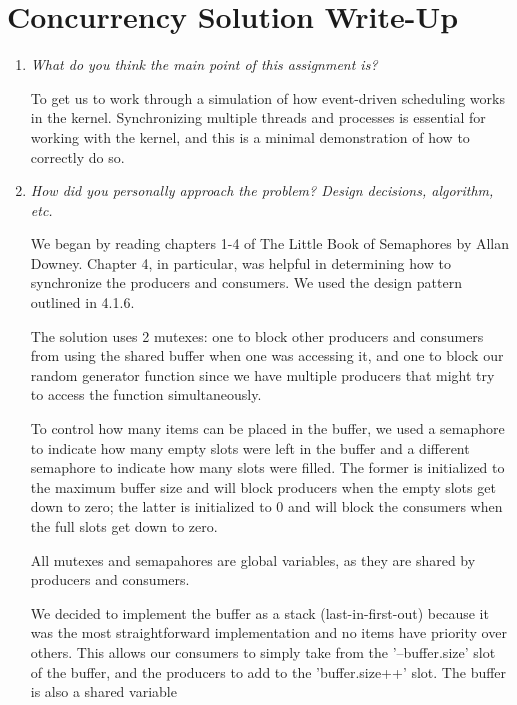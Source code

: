 \documentclass[letterpaper, onecolumn, draftclsnofoot, 10pt, compsoc]{IEEEtran}
\begin{document}
\section{Concurrency Solution Write-Up}
    \begin{singlespace}
    \par
        \begin{enumerate}
            \item \textit{What do you think the main point of this assignment is?}\par
            To get us to work through a simulation of how event-driven scheduling works in the kernel. Synchronizing multiple threads and processes is essential for working with the kernel, and this is a minimal demonstration of how to correctly do so.
            \par
            \item \textit{How did you personally approach the problem? Design decisions, algorithm, etc.}\par
            We began by reading chapters 1-4 of The Little Book of Semaphores by Allan Downey\cite{DowneyBOS}. Chapter 4, in particular, was helpful in determining how to synchronize the producers and consumers. We used the design pattern outlined in 4.1.6.\par
            
            The solution uses 2 mutexes: one to block other producers and consumers from using the shared buffer when one was accessing it, and one to block our random generator function since we have multiple producers that might try to access the function simultaneously.\par
            
            To control how many items can be placed in the buffer, we used a semaphore to indicate how many empty slots were left in the buffer and a different semaphore to indicate how many slots were filled. The former is initialized to the maximum buffer size and will block producers when the empty slots get down to zero; the latter is initialized to 0 and will block the consumers when the full slots get down to zero.\par
            
            All mutexes and semapahores are global variables, as they are shared by producers and consumers.\par
            
            We decided to implement the buffer as a stack (last-in-first-out) because it was the most straightforward implementation and no items have priority over others. This allows our consumers to simply take from the '--buffer.size' slot of the buffer, and the producers to add to the 'buffer.size++' slot. The buffer is also a shared variable\par
            

\end{enumerate}
\end{singlespace}
\end{document}
